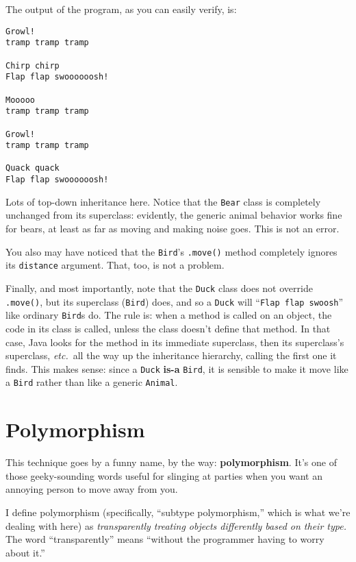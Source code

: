 \begin{samepage}
The output of the program, as you can easily verify, is:

\begin{Verbatim}[fontsize=\footnotesize,samepage=true,frame=single]
Growl!
tramp tramp tramp 

Chirp chirp
Flap flap swoooooosh!

Mooooo
tramp tramp tramp 

Growl!
tramp tramp tramp 

Quack quack
Flap flap swoooooosh!
\end{Verbatim}
\end{samepage}

Lots of top-down inheritance here. Notice that the \texttt{Bear} class is
completely unchanged from its superclass: evidently, the generic animal
behavior works fine for bears, at least as far as moving and making noise
goes. This is not an error.

You also may have noticed that the \texttt{Bird}'s \texttt{.move()} method
completely ignores its \texttt{distance} argument. That, too, is not a
problem.

Finally, and most importantly, note that the \texttt{Duck} class does not
override \texttt{.move()}, but its superclass (\texttt{Bird}) does, and so a
\texttt{Duck} will ``\texttt{Flap flap swoosh}'' like ordinary \texttt{Bird}s
do. The rule is: when a method is called on an object, the code in its class
is called, unless the class doesn't define that method. In that case, Java
looks for the method in its immediate superclass, then its superclass's
superclass, \textit{etc.}~all the way up the inheritance hierarchy, calling
the first one it finds. This makes sense: since a \texttt{Duck} \textbf{is-a}
\texttt{Bird}, it is sensible to make it move like a \texttt{Bird} rather than
like a generic \texttt{Animal}.

\section{Polymorphism}

This technique goes by a funny name, by the way: \textbf{polymorphism}. It's
one of those geeky-sounding words useful for slinging at parties when you want
an annoying person to move away from you.

I define polymorphism (specifically, ``subtype polymorphism,'' which is what
we're dealing with here) as \textit{transparently treating objects differently
based on their type.} The word ``transparently'' means ``without the
programmer having to worry about it.''

